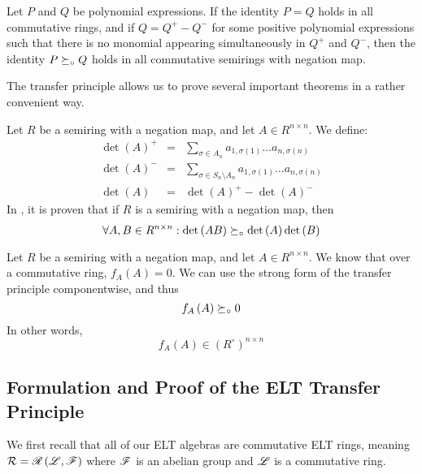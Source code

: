 \begin{thm}
Let $P$ and $Q$ be polynomial expressions. If the identity $P=Q$ holds in all commutative rings, and if $Q=Q^+-Q^-$ for some positive polynomial expressions such that there is no monomial appearing simultaneously in $Q^+$ and $Q^-$, then the identity $P\succeq_\circ Q$ holds in all commutative semirings with negation map.
\end{thm}

The transfer principle allows us to prove several important theorems in a rather convenient way.

\begin{cor}\label{cor:trans-det-mult}
Let $R$ be a semiring with a negation map, and let $A\in R^{n\times n}$. We define:
\begin{eqnarray*}
\det\left(A\right)^+&=&\sum_{\sigma\in A_n}a_{1,\sigma\left(1\right)}\dots a_{n,\sigma\left(n\right)}\\
\det\left(A\right)^-&=&\sum_{\sigma\in S_n\setminus A_n}a_{1,\sigma\left(1\right)}\dots a_{n,\sigma\left(n\right)}\\
\det\left(A\right)&=&\det\left(A\right)^+-\det\left(A\right)^-
\end{eqnarray*}
In \cite[Corollary 4.8]{Akian2008}, it is proven that if $R$ is a semiring with a negation map, then
$$\forall A,B\in R^{n\times n}:\det\left(AB\right)\succeq_\circ\det\left(A\right)\det\left(B\right)$$
\end{cor}

\begin{cor}\label{cor:cayley-hamilton}
Let $R$ be a semiring with a negation map, and let $A\in R^{n\times n}$. We know that over a commutative ring, $f_A\left(A\right)=0$. We can use the strong form of the transfer principle componentwise, and thus
$$f_A\left(A\right)\succeq_\circ 0$$
In other words,
$$f_A\left(A\right)\in \left(R^\circ\right)^{n\times n}$$
\end{cor}

\subsection{Formulation and Proof of the ELT Transfer Principle}

We first recall that all of our ELT algebras are commutative ELT rings, meaning $\mathcal{R}=\mathscr{R}\left(\mathscr{L},\mathscr{F}\right)$ where $\mathscr{F}$ is an abelian group and $\mathscr{L}$ is a commutative ring.\\

